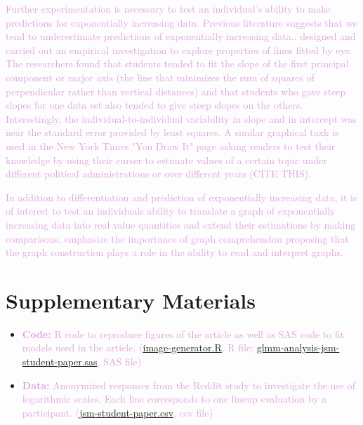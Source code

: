 \documentclass[]{interact}
\theoremstyle{plain}%
\theoremstyle{definition}
\theoremstyle{remark}
\begin{document}
\textcolor{Plum}{
Further experimentation is necessary to test an individual's ability to make predictions for exponentially increasing data. 
Previous literature suggests that we tend to underestimate predictions of exponentially increasing data.\citep{jones_generalized_1979, jones_polynomial_1977, wagenaar_extrapolation_1978}.
\citep{mosteller_eye_1981} designed and carried out an empirical investigation to explore properties of lines fitted by eye. 
The researchers found that students tended to fit the slope of the first principal component or major axis (the line that minimizes the sum of squares of perpendicular rather than vertical distances) and that students who gave steep slopes for one data set also tended to give steep slopes on the others. 
Interestingly, the individual-to-individual variability in slope and in intercept was near the standard error provided by least squares.
A similar graphical taxk is used in the New York Times "You Draw It" page asking readers to test their knowledge by using their curser to estimate values of a certain topic under different political administrations or over different years (CITE THIS).
}

\textcolor{Plum}{
In addition to differentiation and prediction of exponentially increasing data, it is of interest to test an individuals ability to translate a graph of exponentially increasing data into real value quantities and extend their estimations by making comparisons. 
\citep{friel_making_2001} emphasize the importance of graph comprehension proposing that the graph construction plays a role in the ability to read and interpret graphs.
}

\hypertarget{supplementary-materials}{%
\section*{Supplementary Materials}\label{supplementary-materials}}

\begin{itemize}
\item
  \textcolor{Plum}{\textbf{Code:} R code to reproduce figures of the article as well as SAS code to fit models used in the article. (\href{https://github.com/srvanderplas/Perception-of-Log-Scales/blob/master/manuscripts/jsm-2021-student-paper-submission/code/image-generator.R}{image-generator.R}, R file; \href{https://github.com/srvanderplas/Perception-of-Log-Scales/blob/master/lineups-pilot-analysis/sasCode/glmm-analysis-jsm-student-paper.sas}{glmm-analysis-jsm-student-paper.sas}, SAS file)}
\item
  \textcolor{Plum}{\textbf{Data:} Anonymized responses from the Reddit study to investigate the use of logarithmic scales. Each line corresponds to one lineup evaluation by a participant. (\href{https://github.com/srvanderplas/Perception-of-Log-Scales/blob/master/lineups-pilot-analysis/data/jsm-student-paper-11302020.csv}{jsm-student-paper.csv}, csv file)}
\end{itemize}
\end{document}
